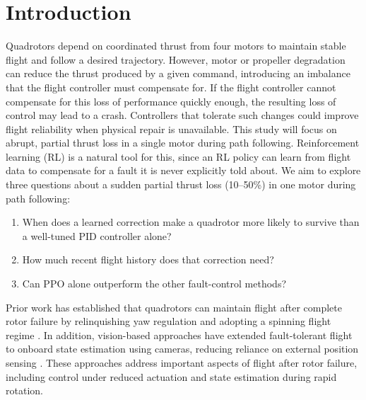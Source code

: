 \documentclass[12pt,letterpaper]{article}
\begin{document}

\section{Introduction}

Quadrotors depend on coordinated thrust from four motors to maintain stable flight and follow a desired trajectory. However, motor or propeller degradation can reduce the thrust produced by a given command, introducing an imbalance that the flight controller must compensate for. If the flight controller cannot compensate for this loss of performance quickly enough, the resulting loss of control may lead to a crash. Controllers that tolerate such changes could improve flight reliability when physical repair is unavailable. This study will focus on abrupt, partial thrust loss in a single motor during path following. Reinforcement learning (RL) is a natural tool for this, since an RL policy can learn from flight data to compensate for a fault it is never explicitly told about. We aim to explore three questions about a sudden partial thrust loss (10--50\%) in one motor during path following:

\begin{enumerate}
    \item When does a learned correction make a quadrotor more likely to survive than a well-tuned PID controller alone?
    \item How much recent flight history does that correction need?
    \item Can PPO alone outperform the other fault-control methods?
\end{enumerate}

Prior work has established that quadrotors can maintain flight after complete rotor failure by relinquishing yaw regulation and adopting a spinning flight regime \citep{mueller2014}. In addition, vision-based approaches have extended fault-tolerant flight to onboard state estimation using cameras, reducing reliance on external position sensing \citep{Sun_2021}. These approaches address important aspects of flight after rotor failure, including control under reduced actuation and state estimation during rapid rotation.
\end{document}
